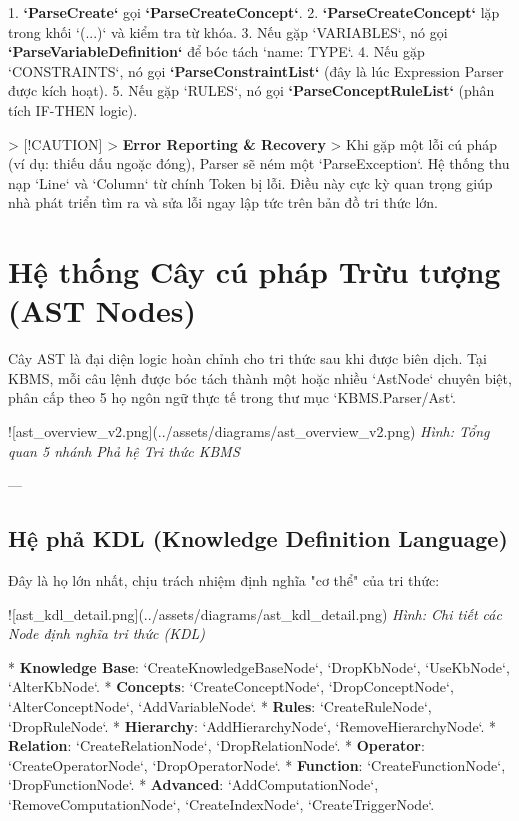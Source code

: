 1.  \textbf{`ParseCreate`} gọi \textbf{`ParseCreateConcept`}.
2.  \textbf{`ParseCreateConcept`} lặp trong khối `(...)` và kiểm tra từ khóa.
3.  Nếu gặp `VARIABLES`, nó gọi \textbf{`ParseVariableDefinition`} để bóc tách `name: TYPE`.
4.  Nếu gặp `CONSTRAINTS`, nó gọi \textbf{`ParseConstraintList`} (đây là lúc Expression Parser được kích hoạt).
5.  Nếu gặp `RULES`, nó gọi \textbf{`ParseConceptRuleList`} (phân tích IF-THEN logic).

> [!CAUTION]
> \textbf{Error Reporting \& Recovery}
> Khi gặp một lỗi cú pháp (ví dụ: thiếu dấu ngoặc đóng), Parser sẽ ném một `ParseException`. Hệ thống thu nạp `Line` và `Column` từ chính Token bị lỗi. Điều này cực kỳ quan trọng giúp nhà phát triển tìm ra và sửa lỗi ngay lập tức trên bản đồ tri thức lớn. 🕵️‍♂️

\section{Hệ thống Cây cú pháp Trừu tượng (AST Nodes)}

Cây AST là đại diện logic hoàn chỉnh cho tri thức sau khi được biên dịch. Tại KBMS, mỗi câu lệnh được bóc tách thành một hoặc nhiều `AstNode` chuyên biệt, phân cấp theo 5 họ ngôn ngữ thực tế trong thư mục `KBMS.Parser/Ast`.

![ast\_overview\_v2.png](../assets/diagrams/ast\_overview\_v2.png)
\textit{Hình: Tổng quan 5 nhánh Phả hệ Tri thức KBMS}

---

\subsection{Hệ phả KDL (Knowledge Definition Language)}
Đây là họ lớn nhất, chịu trách nhiệm định nghĩa "cơ thể" của tri thức:

![ast\_kdl\_detail.png](../assets/diagrams/ast\_kdl\_detail.png)
\textit{Hình: Chi tiết các Node định nghĩa tri thức (KDL)}

*   \textbf{Knowledge Base}: `CreateKnowledgeBaseNode`, `DropKbNode`, `UseKbNode`, `AlterKbNode`.
*   \textbf{Concepts}: `CreateConceptNode`, `DropConceptNode`, `AlterConceptNode`, `AddVariableNode`.
*   \textbf{Rules}: `CreateRuleNode`, `DropRuleNode`.
*   \textbf{Hierarchy}: `AddHierarchyNode`, `RemoveHierarchyNode`.
*   \textbf{Relation}: `CreateRelationNode`, `DropRelationNode`.
*   \textbf{Operator}: `CreateOperatorNode`, `DropOperatorNode`.
*   \textbf{Function}: `CreateFunctionNode`, `DropFunctionNode`.
*   \textbf{Advanced}: `AddComputationNode`, `RemoveComputationNode`, `CreateIndexNode`, `CreateTriggerNode`.

